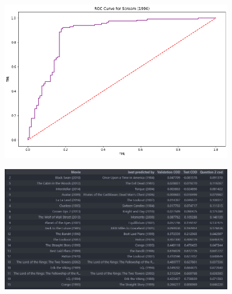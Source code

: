 \documentclass{article}
\begin{document}
\begin{figure}[t]
  \centering
  \includegraphics[width=10cm]{data anlysis project 2/logistic_4.png}
 \caption{}
 \label{fig:1}
\end{figure}

\begin{figure}[t]
  \centering
  \includegraphics[width=10cm]{data anlysis project 2/extra_credit_fig.jpg}
 \caption{}
 \label{fig:1}
\end{figure}
\end{document}
